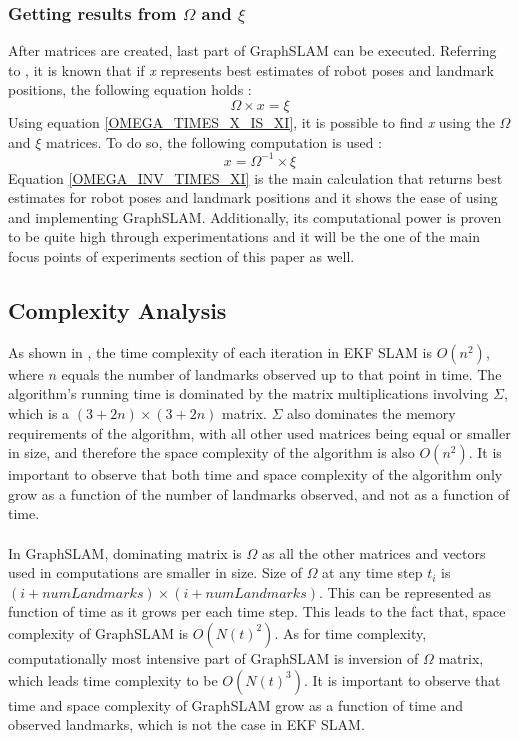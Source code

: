 \documentclass{ba-kecs}
\numberwithin{figure}{section}
\numberwithin{equation}{section}
\begin{document}
\subsubsection{Getting results from $\Omega$ and $\xi$}
	After matrices are created, last part of GraphSLAM can be executed. Referring to \cite{sik2}, it is known that if \textit{x} represents best estimates of robot poses and landmark positions, the following equation holds :
	\begin{equation}
	\Omega \times x = \xi \label{OMEGA_TIMES_X_IS_XI}
	\end{equation}
	Using equation \eqref{OMEGA_TIMES_X_IS_XI}, it is possible to find \textit{x} using the $\Omega$ and $\xi$ matrices. To do so, the following computation is used :
	\begin{equation}
	x = \Omega^{-1} \times \xi \label{OMEGA_INV_TIMES_XI}
	\end{equation}
	Equation \eqref{OMEGA_INV_TIMES_XI} is the main calculation that returns best estimates for robot poses and landmark positions and it shows the ease of using and implementing GraphSLAM. Additionally, its computational power is proven to be quite high through experimentations\cite{sik,sik2} and it will be the one of the main focus points of experiments section of this paper as well.


\subsection{Complexity Analysis}
As shown in \cite{dennis}, the time complexity of each iteration in EKF SLAM is $O(n^2)$, where $n$ equals the number of landmarks observed up to that point in time. The algorithm's running time is dominated by the matrix multiplications involving $\Sigma$, which is a $(3 + 2n) \times (3 + 2n)$ matrix. $\Sigma$ also dominates the memory requirements of the algorithm, with all other used matrices being equal or smaller in size, and therefore the space complexity of the algorithm is also $O(n^2)$. It is important to observe that both time and space complexity of the algorithm only grow as a function of the number of landmarks observed, and not as a function of time.\\ \\
In GraphSLAM, dominating matrix is $\Omega$ as all the other matrices and vectors used in computations are smaller in size. Size of $\Omega$ at any time step $t_{i}$ is $(i+numLandmarks) \times (i+numLandmarks)$. This can be represented as function of time as it grows per each time step. This leads to the fact that, space complexity of GraphSLAM is $O(N(t)^2)$. As for time complexity, computationally most intensive part of GraphSLAM is inversion of $\Omega$ matrix, which leads time complexity to be $O(N(t)^3)$. It is important to observe that time and space complexity of GraphSLAM grow as a function of time and observed landmarks, which is not the case in EKF SLAM.
\end{document}
